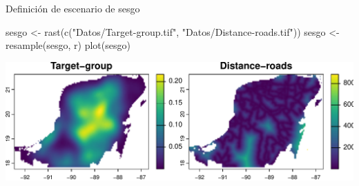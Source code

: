 \documentclass[
  11pt,
  ignorenonframetext,
]{beamer}
\newenvironment{Shaded}{}{}
\newcommand{\FunctionTok}[1]{\textcolor[rgb]{0.02,0.16,0.49}{#1}}
\newcommand{\NormalTok}[1]{#1}
\newcommand{\OtherTok}[1]{\textcolor[rgb]{0.00,0.44,0.13}{#1}}
\newcommand{\StringTok}[1]{\textcolor[rgb]{0.25,0.44,0.63}{#1}}
\begin{document}
\begin{frame}[fragile]{Definición de escenario de sesgo}
\protect\hypertarget{definiciuxf3n-de-escenario-de-sesgo}{}
\begin{Shaded}
\begin{Highlighting}[]
\NormalTok{sesgo }\OtherTok{\textless{}{-}} \FunctionTok{rast}\NormalTok{(}\FunctionTok{c}\NormalTok{(}\StringTok{"Datos/Target{-}group.tif"}\NormalTok{, }
                \StringTok{"Datos/Distance{-}roads.tif"}\NormalTok{))}
\NormalTok{sesgo }\OtherTok{\textless{}{-}} \FunctionTok{resample}\NormalTok{(sesgo, r)}
\FunctionTok{plot}\NormalTok{(sesgo)}
\end{Highlighting}
\end{Shaded}

\begin{center}\includegraphics{Tutorial-spatstat-2_files/figure-beamer/unnamed-chunk-21-1} \end{center}
\end{frame}
\end{document}
